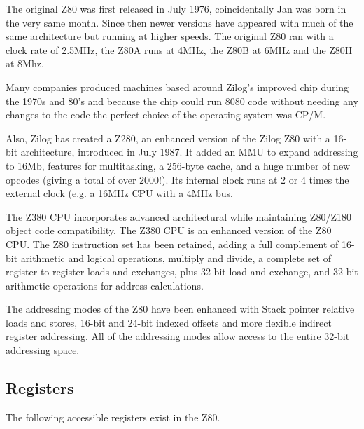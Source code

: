 The original Z80 was first released in July 1976, coincidentally Jan was born in the very same month. Since then newer versions have appeared with much of the same architecture but running at higher speeds. The original Z80 ran with a clock rate of 2.5MHz, the Z80A runs at 4MHz, the Z80B at 6MHz and the Z80H at 8Mhz. 

Many companies produced machines based around Zilog's improved chip during the 1970s and 80's and because the chip could run 8080 code without needing any changes to the code the perfect choice of the operating system was CP/M. 

Also, Zilog has created a Z280, an enhanced version of the Zilog Z80 with a 16-bit architecture, introduced in July 1987. It added an MMU to expand addressing to 16Mb, features for multitasking, a 256-byte cache, and a huge number of new opcodes (giving a total of over 2000!). Its internal clock runs at 2 or 4 times the external clock (e.g. a 16MHz CPU with a 4MHz bus.

The Z380 CPU incorporates advanced architectural while maintaining Z80/Z180 object code compatibility. The Z380 CPU is an enhanced version of the Z80 CPU. The Z80 instruction set has been retained, adding a full complement of 16-bit arithmetic and logical operations, multiply and divide, a complete set of register-to-register loads and exchanges, plus 32-bit load and exchange, and 32-bit arithmetic operations for address calculations.

The addressing modes of the Z80 have been enhanced with Stack pointer relative loads and stores, 16-bit and 24-bit indexed offsets and more flexible indirect register addressing. All of the addressing modes allow access to the entire 32-bit addressing space.


\subsection{Registers}

The following accessible registers exist in the Z80.

\newcommand{\RegDesc}[2]{\rdelim\}{#1}{1ex}[#2]}

